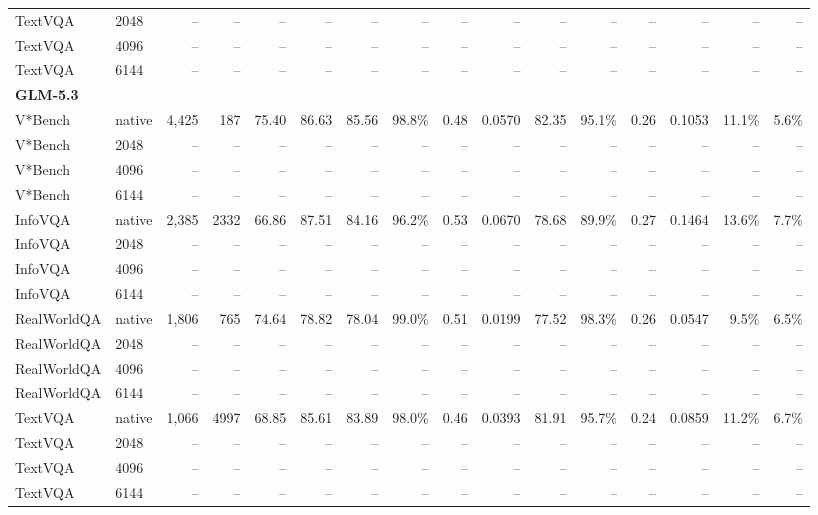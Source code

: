 \begin{table}[t]
{\begin{tabular}{llrrrrrrrrrrrrrr}
TextVQA & 2048 & -- & -- & -- & -- & -- & -- & -- & -- & -- & -- & -- & -- & -- & -- \\
TextVQA & 4096 & -- & -- & -- & -- & -- & -- & -- & -- & -- & -- & -- & -- & -- & -- \\
TextVQA & 6144 & -- & -- & -- & -- & -- & -- & -- & -- & -- & -- & -- & -- & -- & -- \\
\midrule
\multicolumn{10}{l}{\textbf{GLM-5.3}} \\
V*Bench & native & 4,425 & 187 & 75.40 & 86.63 & 85.56 & 98.8\% & 0.48 & 0.0570 & 82.35 & 95.1\% & 0.26 & 0.1053 & 11.1\% & 5.6\% \\
V*Bench & 2048 & -- & -- & -- & -- & -- & -- & -- & -- & -- & -- & -- & -- & -- & -- \\
V*Bench & 4096 & -- & -- & -- & -- & -- & -- & -- & -- & -- & -- & -- & -- & -- & -- \\
V*Bench & 6144 & -- & -- & -- & -- & -- & -- & -- & -- & -- & -- & -- & -- & -- & -- \\
InfoVQA & native & 2,385 & 2332 & 66.86 & 87.51 & 84.16 & 96.2\% & 0.53 & 0.0670 & 78.68 & 89.9\% & 0.27 & 0.1464 & 13.6\% & 7.7\% \\
InfoVQA & 2048 & -- & -- & -- & -- & -- & -- & -- & -- & -- & -- & -- & -- & -- & -- \\
InfoVQA & 4096 & -- & -- & -- & -- & -- & -- & -- & -- & -- & -- & -- & -- & -- & -- \\
InfoVQA & 6144 & -- & -- & -- & -- & -- & -- & -- & -- & -- & -- & -- & -- & -- & -- \\
RealWorldQA & native & 1,806 & 765 & 74.64 & 78.82 & 78.04 & 99.0\% & 0.51 & 0.0199 & 77.52 & 98.3\% & 0.26 & 0.0547 & 9.5\% & 6.5\% \\
RealWorldQA & 2048 & -- & -- & -- & -- & -- & -- & -- & -- & -- & -- & -- & -- & -- & -- \\
RealWorldQA & 4096 & -- & -- & -- & -- & -- & -- & -- & -- & -- & -- & -- & -- & -- & -- \\
RealWorldQA & 6144 & -- & -- & -- & -- & -- & -- & -- & -- & -- & -- & -- & -- & -- & -- \\
TextVQA & native & 1,066 & 4997 & 68.85 & 85.61 & 83.89 & 98.0\% & 0.46 & 0.0393 & 81.91 & 95.7\% & 0.24 & 0.0859 & 11.2\% & 6.7\% \\
TextVQA & 2048 & -- & -- & -- & -- & -- & -- & -- & -- & -- & -- & -- & -- & -- & -- \\
TextVQA & 4096 & -- & -- & -- & -- & -- & -- & -- & -- & -- & -- & -- & -- & -- & -- \\
TextVQA & 6144 & -- & -- & -- & -- & -- & -- & -- & -- & -- & -- & -- & -- & -- & -- \\
\bottomrule
\end{tabular}}
\end{table}
